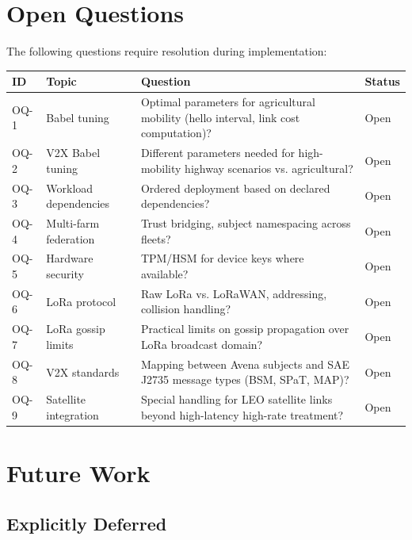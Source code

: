 \section{Open Questions}
\label{sec:openquestions}

The following questions require resolution during implementation:

\begin{longtable}{@{}p{0.5cm}p{3cm}p{7cm}p{2cm}@{}}
\toprule
\textbf{ID} & \textbf{Topic} & \textbf{Question} & \textbf{Status} \\
\midrule
\endhead
OQ-1 & Babel tuning & Optimal parameters for agricultural mobility (hello interval, link cost computation)? & Open \\
OQ-2 & V2X Babel tuning & Different parameters needed for high-mobility highway scenarios vs. agricultural? & Open \\
OQ-3 & Workload dependencies & Ordered deployment based on declared dependencies? & Open \\
OQ-4 & Multi-farm federation & Trust bridging, subject namespacing across fleets? & Open \\
OQ-5 & Hardware security & TPM/HSM for device keys where available? & Open \\
OQ-6 & LoRa protocol & Raw LoRa vs. LoRaWAN, addressing, collision handling? & Open \\
OQ-7 & LoRa gossip limits & Practical limits on gossip propagation over LoRa broadcast domain? & Open \\
OQ-8 & V2X standards & Mapping between Avena subjects and SAE J2735 message types (BSM, SPaT, MAP)? & Open \\
OQ-9 & Satellite integration & Special handling for LEO satellite links beyond high-latency high-rate treatment? & Open \\
\bottomrule
\end{longtable}

\section{Future Work}

\subsection{Explicitly Deferred}

